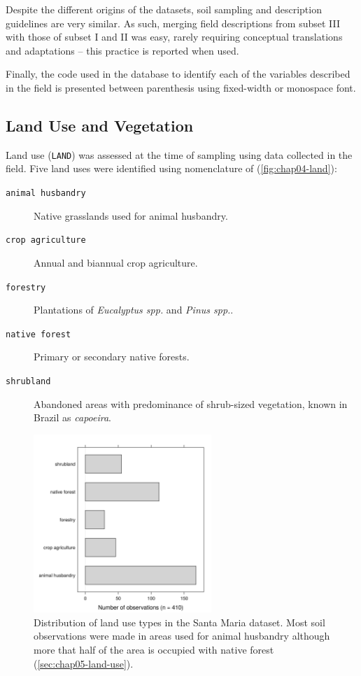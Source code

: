 Despite the different origins of the datasets, soil sampling and description guidelines are very similar. As 
such, merging field descriptions from subset III with those of subset I and II was easy, rarely requiring 
conceptual translations and adaptations -- this practice is reported when used.

Finally, the code used in the database to identify each of the variables described in the field is presented 
between parenthesis using fixed-width or monospace font.

\subsection{Land Use and Vegetation}

Land use (\texttt{LAND}) was assessed at the time of sampling using data collected in the field. Five land 
uses were identified using nomenclature of \citet{FAO2006} (\autoref{fig:chap04-land}):

\begin{description}
\item[\texttt{animal husbandry}] Native grasslands used for animal husbandry.
\item[\texttt{crop agriculture}] Annual and biannual crop agriculture.
\item[\texttt{forestry}] Plantations of \textit{Eucalyptus spp.} and \textit{Pinus spp.}.
\item[\texttt{native forest}] Primary or secondary native forests.
\item[\texttt{shrubland}] Abandoned areas with predominance of shrub-sized vegetation, known in Brazil as 
\emph{capoeira}.
\end{description}

\begin{figure}[!ht]
\centering
\includegraphics[width=0.60\textwidth]{fig/chap04-land}
\caption[Distribution of land use types in the Santa Maria dataset.]{Distribution of land use types in the 
Santa Maria dataset. Most soil observations were made in areas used for animal husbandry although more that 
half of the area is occupied with native forest (\autoref{sec:chap05-land-use}).}
\label{fig:chap04-land}
\end{figure}

